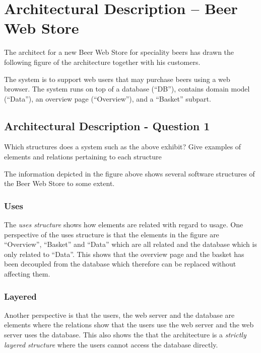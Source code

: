 \section{Architectural Description -- Beer Web Store}

The architect for a new Beer Web Store for speciality beers has drawn
the following figure of the architecture together with his customers.
\begin{figure}[h!]
  \centerline{}
\end{figure}
The system is to support web users that may purchase beers using a web
browser. The system runs on top of a database (``DB''), contains
domain model (``Data''), an overview page (``Overview''), and a
``Basket'' subpart.

\subsection{Architectural Description - Question 1}
\label{sec:arch_desc_q1}

\begin{question}
Which structures does a system such as the above exhibit?
Give examples of elements and relations pertaining to each
structure
\end{question}

The information depicted in the figure above shows several
software structures of the Beer Web Store to some extent.

\subsubsection{Uses}

The \emph{uses structure} shows how elements are related with regard
to usage. One perspective of the uses structure is that the
elements in the figure are ``Overview'', ``Basket'' and ``Data''
which are all related and the database which is only related
to ``Data''. This shows that the overview page and the basket
has been decoupled from the database which therefore can be
replaced without affecting them.

\subsubsection{Layered}

Another perspective is that the users, the web server and the
database are elements where the relations show that the users
use the web server and the web server uses the database. This
also shows the that the architecture is a
\emph{strictly layered structure} where the users cannot
access the database directly.

